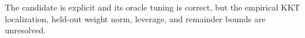 The candidate is explicit and its oracle tuning is correct, but the empirical KKT localization, held-out weight norm, leverage, and remainder bounds are unresolved.